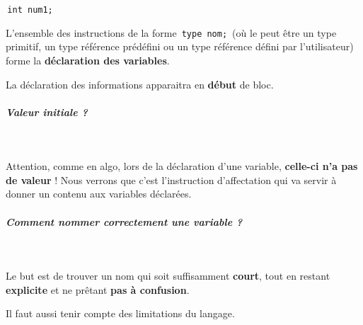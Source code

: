 \documentclass[11pt,a4paper]{article}
\begin{document}
            \par
        \,\verb|int num1;|\,
            \par
        
          L'ensemble des instructions de la forme \,\verb|type nom;|\,
          (o\`u le \verb@type@ peut \^etre un type primitif, un type r\'ef\'erence pr\'ed\'efini ou un type r\'ef\'erence d\'efini par l'utilisateur) 
          forme la \textbf{d\'eclaration des variables}. 
        
            \par
        
          La d\'eclaration des informations apparaitra en \textbf{d\'ebut} de bloc.
        
            \par
        
			
		\subparagraph{Valeur initiale ?} 
		
					\textcolor{white}{.} \par
				
            \par
        
          Attention, comme en algo, lors de la d\'eclaration d'une variable, \textbf{celle-ci n'a pas de valeur} ! 
          Nous verrons que c'est l'instruction d'affectation qui va servir \`a donner un contenu aux variables d\'eclar\'ees.
        
            \par
        
			
		\subparagraph{Comment nommer correctement une variable ?} 
		
					\textcolor{white}{.} \par
				
            \par
        
          Le but est de trouver un nom qui soit suffisamment \textbf{court}, 
          tout en restant \textbf{explicite} et ne pr\^etant \textbf{pas \`a confusion}.
        
            \par
        
          Il faut aussi tenir compte des limitations du langage.
          
\end{document}
